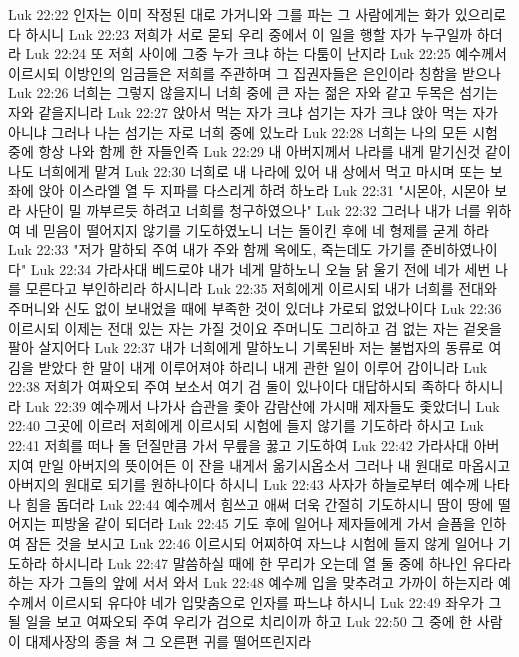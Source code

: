 Luk 22:22  인자는 이미 작정된 대로 가거니와 그를 파는 그 사람에게는 화가 있으리로다 하시니
Luk 22:23  저희가 서로 묻되 우리 중에서 이 일을 행할 자가 누구일까 하더라
Luk 22:24  또 저희 사이에 그중 누가 크냐 하는 다툼이 난지라
Luk 22:25  예수께서 이르시되 이방인의 임금들은 저희를 주관하며 그 집권자들은 은인이라 칭함을 받으나
Luk 22:26  너희는 그렇지 않을지니 너희 중에 큰 자는 젊은 자와 같고 두목은 섬기는 자와 같을지니라
Luk 22:27  앉아서 먹는 자가 크냐 섬기는 자가 크냐 앉아 먹는 자가 아니냐 그러나 나는 섬기는 자로 너희 중에 있노라
Luk 22:28  너희는 나의 모든 시험 중에 항상 나와 함께 한 자들인즉
Luk 22:29  내 아버지께서 나라를 내게 맡기신것 같이 나도 너희에게 맡겨
Luk 22:30  너희로 내 나라에 있어 내 상에서 먹고 마시며 또는 보좌에 앉아 이스라엘 열 두 지파를 다스리게 하려 하노라
Luk 22:31  "시몬아, 시몬아 보라 사단이 밀 까부르듯 하려고 너희를 청구하였으나"
Luk 22:32  그러나 내가 너를 위하여 네 믿음이 떨어지지 않기를 기도하였노니 너는 돌이킨 후에 네 형제를 굳게 하라
Luk 22:33  "저가 말하되 주여 내가 주와 함께 옥에도, 죽는데도 가기를 준비하였나이다"
Luk 22:34  가라사대 베드로야 내가 네게 말하노니 오늘 닭 울기 전에 네가 세번 나를 모른다고 부인하리라 하시니라
Luk 22:35  저희에게 이르시되 내가 너희를 전대와 주머니와 신도 없이 보내었을 때에 부족한 것이 있더냐 가로되 없었나이다
Luk 22:36  이르시되 이제는 전대 있는 자는 가질 것이요 주머니도 그리하고 검 없는 자는 겉옷을 팔아 살지어다
Luk 22:37  내가 너희에게 말하노니 기록된바 저는 불법자의 동류로 여김을 받았다 한 말이 내게 이루어져야 하리니 내게 관한 일이 이루어 감이니라
Luk 22:38  저희가 여짜오되 주여 보소서 여기 검 둘이 있나이다 대답하시되 족하다 하시니라
Luk 22:39  예수께서 나가사 습관을 좇아 감람산에 가시매 제자들도 좇았더니
Luk 22:40  그곳에 이르러 저희에게 이르시되 시험에 들지 않기를 기도하라 하시고
Luk 22:41  저희를 떠나 돌 던질만큼 가서 무릎을 꿇고 기도하여
Luk 22:42  가라사대 아버지여 만일 아버지의 뜻이어든 이 잔을 내게서 옮기시옵소서 그러나 내 원대로 마옵시고 아버지의 원대로 되기를 원하나이다 하시니
Luk 22:43  사자가 하늘로부터 예수께 나타나 힘을 돕더라
Luk 22:44  예수께서 힘쓰고 애써 더욱 간절히 기도하시니 땀이 땅에 떨어지는 피방울 같이 되더라
Luk 22:45  기도 후에 일어나 제자들에게 가서 슬픔을 인하여 잠든 것을 보시고
Luk 22:46  이르시되 어찌하여 자느냐 시험에 들지 않게 일어나 기도하라 하시니라
Luk 22:47  말씀하실 때에 한 무리가 오는데 열 둘 중에 하나인 유다라 하는 자가 그들의 앞에 서서 와서
Luk 22:48  예수께 입을 맞추려고 가까이 하는지라 예수께서 이르시되 유다야 네가 입맞춤으로 인자를 파느냐 하시니
Luk 22:49  좌우가 그 될 일을 보고 여짜오되 주여 우리가 검으로 치리이까 하고
Luk 22:50  그 중에 한 사람이 대제사장의 종을 쳐 그 오른편 귀를 떨어뜨린지라
